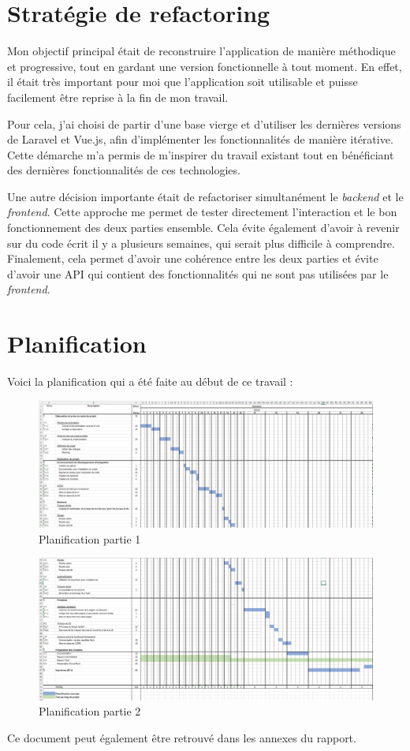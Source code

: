 \section{Stratégie de refactoring}

Mon objectif principal était de reconstruire l'application de manière méthodique et progressive, tout en gardant une version fonctionnelle à tout moment. En effet, il était très important pour moi que l'application soit utilisable et puisse facilement être reprise à la fin de mon travail.

Pour cela, j'ai choisi de partir d'une base vierge et d'utiliser les dernières versions de Laravel et Vue.js, afin d'implémenter les fonctionnalités de manière itérative. Cette démarche m'a permis de m'inspirer du travail existant tout en bénéficiant des dernières fonctionnalités de ces technologies.

Une autre décision importante était de refactoriser simultanément le \emph{backend} et le \emph{frontend}. Cette approche me permet de tester directement l'interaction et le bon fonctionnement des deux parties ensemble. Cela évite également d'avoir à revenir sur du code écrit il y a plusieurs semaines, qui serait plus difficile à comprendre. Finalement, cela permet d'avoir une cohérence entre les deux parties et évite d'avoir une API qui contient des fonctionnalités qui ne sont pas utilisées par le \emph{frontend}.

\section{Planification}
Voici la planification qui a été faite au début de ce travail :

\begin{center}
    \begin{figure}[H]
        \includegraphics[width=14cm]{./assets/figures/planif1.png}
        \caption{Planification partie 1}
    \end{figure}
\end{center}

\begin{center}
    \begin{figure}[H]
        \includegraphics[width=14cm]{./assets/figures/planif2.png}
        \caption{Planification partie 2}
    \end{figure}
\end{center}

Ce document peut également être retrouvé dans les annexes du rapport.